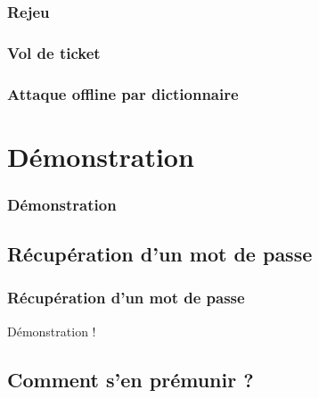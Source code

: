 \documentclass[svgnames]{beamer}
\begin{document}
\begin{frame}
 \frametitle{Rejeu}
 
\end{frame}

\begin{frame}
 \frametitle{Vol de ticket}
 
\end{frame}


\begin{frame}
 \frametitle{Attaque offline par dictionnaire}
 
 
\end{frame}


\section{Démonstration}

\begin{frame}
  \frametitle{Démonstration}
\end{frame}

\subsection{Récupération d'un mot de passe}
\begin{frame}
 \frametitle{Récupération d'un mot de passe}
 
 \begin{center}
  Démonstration !
  
 \end{center}
\end{frame}


\subsection{Comment s'en prémunir ?}
\end{document}
